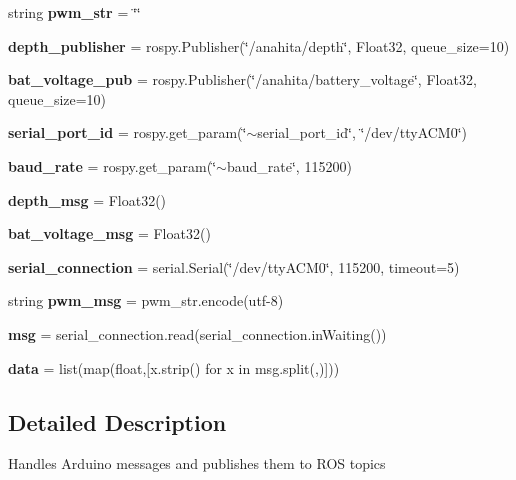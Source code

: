 \begin{DoxyCompactItemize}
\item 
\mbox{\label{namespacemaster_a0ab7cdc9e0ce04abf59a0eeb18ee4bc3}} 
string {\bfseries pwm\+\_\+str} = \char`\"{}\char`\"{}
\item 
\mbox{\label{namespacemaster_a33c3a3395e1745868c63d706552609a2}} 
{\bfseries depth\+\_\+publisher} = rospy.\+Publisher(\char`\"{}/anahita/depth\char`\"{}, Float32, queue\+\_\+size=10)
\item 
\mbox{\label{namespacemaster_aab23de3cf621870c588f67983f27d831}} 
{\bfseries bat\+\_\+voltage\+\_\+pub} = rospy.\+Publisher(\char`\"{}/anahita/battery\+\_\+voltage\char`\"{}, Float32, queue\+\_\+size=10)
\item 
\mbox{\label{namespacemaster_a03876cb4c3d719a83b33dd998aab36a6}} 
{\bfseries serial\+\_\+port\+\_\+id} = rospy.\+get\+\_\+param(\char`\"{}$\sim$serial\+\_\+port\+\_\+id\char`\"{}, \char`\"{}/dev/tty\+A\+C\+M0\char`\"{})
\item 
\mbox{\label{namespacemaster_a6f9f52463ff5987b763ed390481b1587}} 
{\bfseries baud\+\_\+rate} = rospy.\+get\+\_\+param(\char`\"{}$\sim$baud\+\_\+rate\char`\"{}, 115200)
\item 
\mbox{\label{namespacemaster_a3b33c1185ad8cf93a60c7aea4d10777a}} 
{\bfseries depth\+\_\+msg} = Float32()
\item 
\mbox{\label{namespacemaster_acfa1a7d15989a14c44e56430b5e67c84}} 
{\bfseries bat\+\_\+voltage\+\_\+msg} = Float32()
\item 
\mbox{\label{namespacemaster_a2cdfc1ed79ca0720798ac606944c1bc7}} 
{\bfseries serial\+\_\+connection} = serial.\+Serial(\char`\"{}/dev/tty\+A\+C\+M0\char`\"{}, 115200, timeout=5)
\item 
\mbox{\label{namespacemaster_ab1e9905abf4a550f9a5245a25227ffbb}} 
string {\bfseries pwm\+\_\+msg} = pwm\+\_\+str.\+encode(\textquotesingle{}utf-\/8\textquotesingle{})
\item 
\mbox{\label{namespacemaster_a60638b994e5b3b32e188deddd460bee5}} 
{\bfseries msg} = serial\+\_\+connection.\+read(serial\+\_\+connection.\+in\+Waiting())
\item 
\mbox{\label{namespacemaster_afa402184fd7c5a06c5cea3a4c0204e09}} 
{\bfseries data} = list(map(float,\mbox{[}x.\+strip() for x in msg.\+split(\textquotesingle{},\textquotesingle{})\mbox{]}))
\end{DoxyCompactItemize}


\subsection{Detailed Description}
\begin{DoxyVerb}Handles Arduino messages and publishes them to ROS topics
\end{DoxyVerb}
 